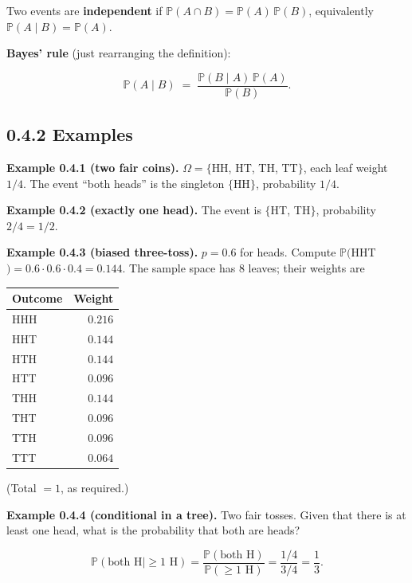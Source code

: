 \documentclass[
  10pt,
  twoside]{book}
\newcounter{none} %
\begin{document}
Two events are \textbf{independent} if
\(\mathbb{P}(A \cap B) = \mathbb{P}(A)\,\mathbb{P}(B)\), equivalently
\(\mathbb{P}(A \mid B) = \mathbb{P}(A)\).

\textbf{Bayes' rule} (just rearranging the definition):

\[\mathbb{P}(A \mid B) \;=\; \frac{\mathbb{P}(B \mid A)\,\mathbb{P}(A)}{\mathbb{P}(B)}.\]

\subsection{0.4.2 Examples}\label{examples-3}

\textbf{Example 0.4.1 (two fair coins).} \(\Omega = \{\)HH, HT, TH,
TT\(\}\), each leaf weight \(1/4\). The event ``both heads'' is the
singleton \(\{\)HH\(\}\), probability \(1/4\).

\textbf{Example 0.4.2 (exactly one head).} The event is \(\{\)HT,
TH\(\}\), probability \(2/4 = 1/2\).

\textbf{Example 0.4.3 (biased three-toss).} \(p = 0.6\) for heads.
Compute \(\mathbb{P}(\)HHT\() = 0.6 \cdot 0.6 \cdot 0.4 = 0.144\). The
sample space has 8 leaves; their weights are

{\def\LTcaptype{none} %
\begin{table}[H]
\centering
\begin{tabular}{|l|r|}
\toprule
Outcome & Weight \\
\midrule



HHH & \(0.216\) \\
HHT & \(0.144\) \\
HTH & \(0.144\) \\
HTT & \(0.096\) \\
THH & \(0.144\) \\
THT & \(0.096\) \\
TTH & \(0.096\) \\
TTT & \(0.064\) \\
\bottomrule
\end{tabular}
\end{table}
}

(Total \(= 1\), as required.)

\textbf{Example 0.4.4 (conditional in a tree).} Two fair tosses. Given
that there is at least one head, what is the probability that both are
heads?

\[\mathbb{P}(\text{both H} \mid \geq 1 \text{ H}) = \frac{\mathbb{P}(\text{both H})}{\mathbb{P}(\geq 1\text{ H})} = \frac{1/4}{3/4} = \frac{1}{3}.\]
\end{document}
